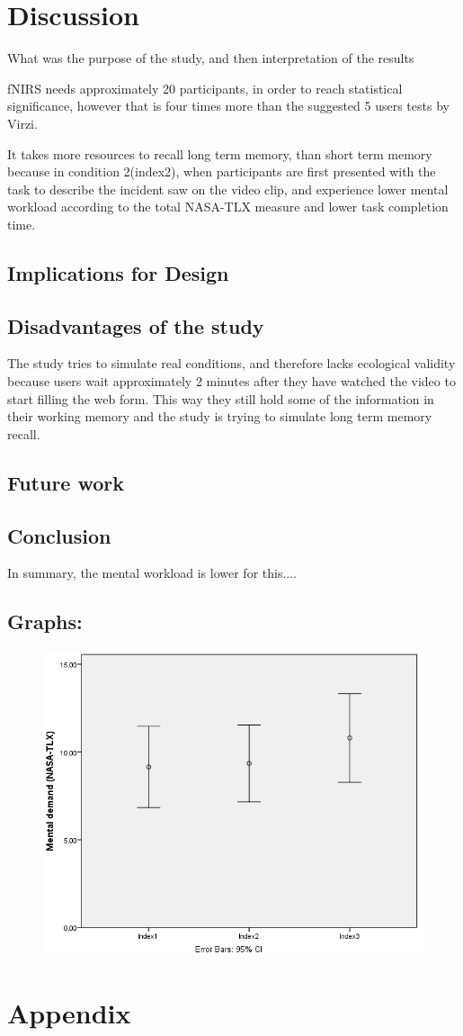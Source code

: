 \documentclass[a4paper]{report}
\begin{document}
\chapter{Discussion}
	What was the purpose of the study, and then interpretation of the results
	
	fNIRS needs approximately 20 participants, in order to reach statistical significance, however that is four times more than the suggested 5 users tests by Virzi\cite{virzi1992refining}.
	
	It takes more resources to recall long term memory, than short term memory because in condition 2(index2), when participants are first presented with the task to describe the incident saw on the video clip, and experience lower mental workload according to the total NASA-TLX measure and lower task completion time.
	
	\section{Implications for Design}
	\section{Disadvantages of the study}
		The study tries to simulate real conditions, and therefore lacks ecological validity because users wait approximately 2 minutes after they have watched the video to start filling the web form. This way they still hold some of the information in their working memory and the study is trying to simulate long term memory recall.
	\section{Future work}
	\section{Conclusion}
		In summary, the mental workload is lower for this....

	\section*{Graphs:}
		\begin{figure}[h]
			\centering
			\includegraphics[width=0.6\linewidth]{mental-demand-graph}
			\caption{}
			\label{fig:mental-demand-graph}
		\end{figure}

	
	
\chapter*{Appendix}
\end{document}
